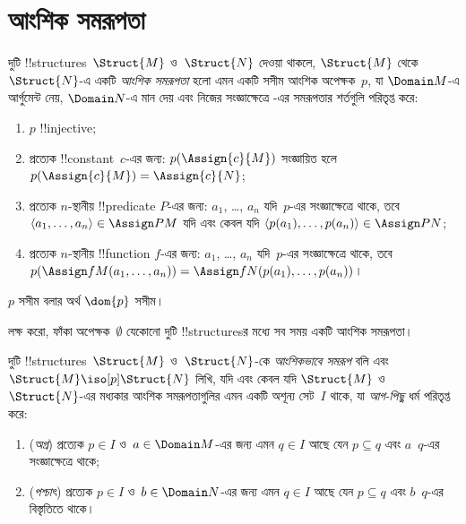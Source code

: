 \documentclass[../../../include/open-logic-section]{subfiles}
\begin{document}
\section{আংশিক সমরূপতা}

\begin{defn}
  দুটি !!{structure}s~$\Struct{M}$ ও~$\Struct{N}$ দেওয়া থাকলে,
  $\Struct{M}$ থেকে $\Struct{N}$-এ একটি \emph{আংশিক সমরূপতা} হলো এমন
  একটি সসীম আংশিক অপেক্ষক~$p$, যা $\Domain M$-এ আর্গুমেন্ট নেয়,
  $\Domain N$-এ মান দেয় এবং নিজের সংজ্ঞাক্ষেত্রে
  -এর সমরূপতার শর্তগুলি পরিতৃপ্ত করে:
  \begin{enumerate}
  \item $p$ !!{injective};
  \item প্রত্যেক !!{constant}~$c$-এর জন্য: $p(\Assign{c}{M})$
    সংজ্ঞায়িত হলে $p(\Assign{c}{M}) = \Assign{c}{N}$;
  \item প্রত্যেক $n$-স্থানীয় !!{predicate} $P$-এর জন্য: $a_1$, \dots,
    $a_n$ যদি~$p$-এর সংজ্ঞাক্ষেত্রে থাকে, তবে $\langle a_1, \dots,
    a_n\rangle \in \Assign P M$ যদি এবং কেবল যদি $\langle p(a_1),
    \dots, p(a_n) \rangle \in \Assign P N$;
  \item প্রত্যেক $n$-স্থানীয় !!{function} $f$-এর জন্য: $a_1$, \dots,
    $a_n$ যদি~$p$-এর সংজ্ঞাক্ষেত্রে থাকে, তবে $p(\Assign f M (a_1,
    \dots,a_n)) = \Assign f N (p(a_1), \dots, p(a_n))$।
  \end{enumerate}
  $p$ সসীম বলার অর্থ $\dom{p}$ সসীম।
\end{defn}

লক্ষ করো, ফাঁকা অপেক্ষক~$\emptyset$ যেকোনো দুটি !!{structure}sর মধ্যে
সব সময় একটি আংশিক সমরূপতা।

\begin{defn}
  দুটি !!{structure}s~$\Struct{M}$ ও~$\Struct{N}$-কে
  \emph{আংশিকভাবে সমরূপ} বলি এবং $\Struct{M} \iso[p] \Struct{N}$ লিখি,
  যদি এবং কেবল যদি $\Struct{M}$ ও~$\Struct{N}$-এর মধ্যকার আংশিক
  সমরূপতাগুলির এমন একটি অশূন্য সেট~$I$ থাকে, যা \emph{আগ-পিছু} ধর্ম
  পরিতৃপ্ত করে:
  \begin{enumerate}
  \item (\emph{অগ্র}) প্রত্যেক $p \in I$ ও~$a \in \Domain M$-এর জন্য
    এমন $q \in I$ আছে যেন $p \subseteq q$ এবং $a$~$q$-এর
    সংজ্ঞাক্ষেত্রে থাকে;
  \item (\emph{পশ্চাৎ}) প্রত্যেক $p \in I$ ও~$b \in \Domain N$-এর জন্য
    এমন $q \in I$ আছে যেন $p \subseteq q$ এবং $b$~$q$-এর বিস্তৃতিতে
    থাকে।
  \end{enumerate}
\end{defn}
\end{document}

